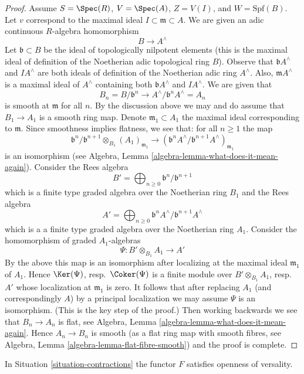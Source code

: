 \begin{proof}
\medskip\noindent
Assume $S = \Spec(R)$, $V = \Spec(A)$, $Z = V(I)$, and $W = \text{Spf}(B)$.
Let $v$ correspond to the maximal ideal $I \subset \mathfrak m \subset A$.
We are given an adic continuous $R$-algebra homomorphism
$$
B \longrightarrow A^\wedge
$$
Let $\mathfrak b \subset B$ be the ideal of topologically nilpotent
elements (this is the maximal ideal of definition of the Noetherian adic
topological ring $B$). Observe that $\mathfrak b A^\wedge$ and
$IA^\wedge$ are both ideals of definition of the Noetherian adic
ring $A^\wedge$. Also, $\mathfrak m A^\wedge$ is a maximal ideal
of $A^\wedge$ containing both $\mathfrak b A^\wedge$ and $IA^\wedge$.
We are given that
$$
B_n = B/\mathfrak b^n \to A^\wedge/\mathfrak b^n A^\wedge = A_n
$$
is smooth at $\mathfrak m$ for all $n$. By the discussion above
we may and do assume that $B_1 \to A_1$ is a smooth ring map.
Denote $\mathfrak m_1 \subset A_1$ the maximal ideal corresponding
to $\mathfrak m$. Since smoothness implies flatness, we see that:
for all $n \geq 1$ the map
$$
\mathfrak b^n/\mathfrak b^{n + 1} \otimes_{B_1} (A_1)_{\mathfrak m_1}
\longrightarrow
\left(\mathfrak b^nA^\wedge/\mathfrak b^{n + 1}A^\wedge\right)_{\mathfrak m_1}
$$
is an isomorphism (see
Algebra, Lemma \ref{algebra-lemma-what-does-it-mean-again}).
Consider the Rees algebra
$$
B' = \bigoplus\nolimits_{n \geq 0} \mathfrak b^n/\mathfrak b^{n + 1}
$$
which is a finite type graded algebra over the Noetherian ring $B_1$ and
the Rees algebra
$$
A' = \bigoplus\nolimits_{n \geq 0}
\mathfrak b^nA^\wedge/\mathfrak b^{n + 1}A^\wedge
$$
which is a a finite type graded algebra over the Noetherian ring $A_1$.
Consider the homomorphism of graded $A_1$-algebras
$$
\Psi : B' \otimes_{B_1} A_1 \longrightarrow A'
$$
By the above this map is an isomorphism after localizing at
the maximal ideal $\mathfrak m_1$ of $A_1$.
Hence $\Ker(\Psi)$, resp.\ $\Coker(\Psi)$ is a finite module
over $B' \otimes_{B_1} A_1$, resp.\ $A'$ whose localization
at $\mathfrak m_1$ is zero. It follows that after replacing
$A_1$ (and correspondingly $A$) by a principal localization
we may assume $\Psi$ is an isomorphism. (This is the key step of the proof.)
Then working backwards we see that $B_n \to A_n$ is flat, see
Algebra, Lemma \ref{algebra-lemma-what-does-it-mean-again}.
Hence $A_n \to B_n$ is smooth (as a flat ring map with smooth
fibres, see Algebra, Lemma \ref{algebra-lemma-flat-fibre-smooth})
and the proof is complete.
\end{proof}

\begin{lemma}
\label{lemma-openness-versality}
In Situation \ref{situation-contractions} the functor
$F$ satisfies openness of versality.
\end{lemma}

